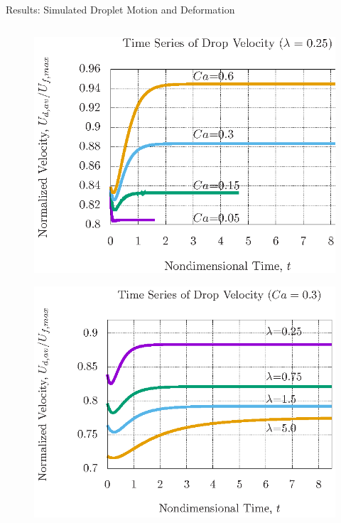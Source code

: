\documentclass[final]{beamer}
\newlength{\colwidth}
\begin{document}
\begin{frame}[t]
\begin{columns}[t]
\begin{column}{\colwidth}
    \begin{block}{Results: Simulated Droplet Motion and Deformation}
        \begin{columns}
          \begin{column}{.66\textwidth} %
                \vspace{1cm}
                \begin{figure}
                    \centering
                    \includegraphics[width=0.9\linewidth]{figures/varyingCa.eps}
                \end{figure}

                \begin{figure}
                  \centering
                  \includegraphics[width=\linewidth]{figures/varyingRMU.eps}
                \end{figure}
            

\end{column}
\end{columns}
\end{block}
\end{column}
\end{columns}
\end{frame}
\end{document}
